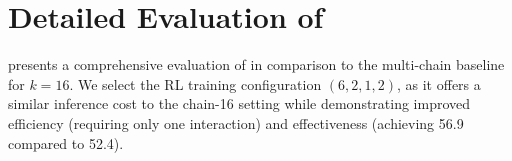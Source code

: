\section{Detailed Evaluation of \treemodel}
 presents a comprehensive evaluation of \treemodel in comparison to the multi-chain baseline for $k=16$. We select the RL training configuration $(6,2,1,2)$, as it offers a similar inference cost to the chain-16 setting while demonstrating improved efficiency (requiring only one interaction) and effectiveness (achieving 56.9 compared to 52.4).
\label{sec:appendix:eptree_table}
\begin{table}[!t]
    \centering
    \caption{$(M,N,L,T)$ Parameter Evaluation of \treemodel on Omni-MATH-500. The table reports the leaf number, PassRate, and total generation tokens under different parameter combinations for $k=16$ and $k=64$.}
    \label{tab:tree-parameter-evaluation}
\end{table}

